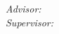 \begin{titlepage}
\vfill\vfill\vfill
{ \large \center 
\textit{Advisor:}\\
\Advisor
}
\vfill\vfill\vfill
{ \large \center 
\textit{Supervisor:}\\
\FirstSupervisor
}

 
\vfill %
\end{titlepage}


\tableofcontents